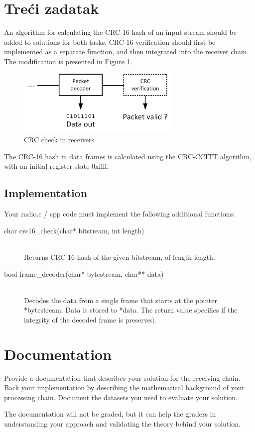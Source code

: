 \documentclass[a4paper]{article}
\begin{document}
\section{Treći zadatak}
An algorithm for calculating the CRC-16 hash of an input stream should be added to solutions for both tasks. CRC-16 verification should first be implemented as a separate function, and then integrated into the receiver chain. The modification is presented in Figure \ref{fig:task3}.

\begin{figure}[h!]
\centering
\includegraphics[width=0.7\textwidth]{Task3.png}
\caption{CRC check in receivers}
\label{fig:task3}
\end{figure}

The CRC-16 hash in data frames is calculated using the CRC-CCITT algorithm, with an initial register state \textsf{0xffff}.

\subsection*{Implementation}
Your radio.c / cpp code must implement the following additional functions:
\begin{description}
	\item[char crc16\_check(char* bitstream, int length)]
	\,\\ Returns CRC-16 hash of the given \textsf{bitstream}, of length \textsf{length}.
	\item[bool frame\_decoder(char* bytestream, char** data)]
	\,\\ Decodes the data from a single frame that starts at the pointer \textsf{*bytestream}. Data is stored to \textsf{*data}. The return value specifies if the integrity of the decoded frame is preserved.
\end{description}

\section{Documentation}

Provide a documentation that describes your solution for the receiving chain. Back your implementation by describing the mathematical background of your processing chain. Document the datasets you used to evaluate your solution.

The documentation will not be graded, but it can help the graders in understanding your approach and validating the theory behind your solution.
\end{document}
